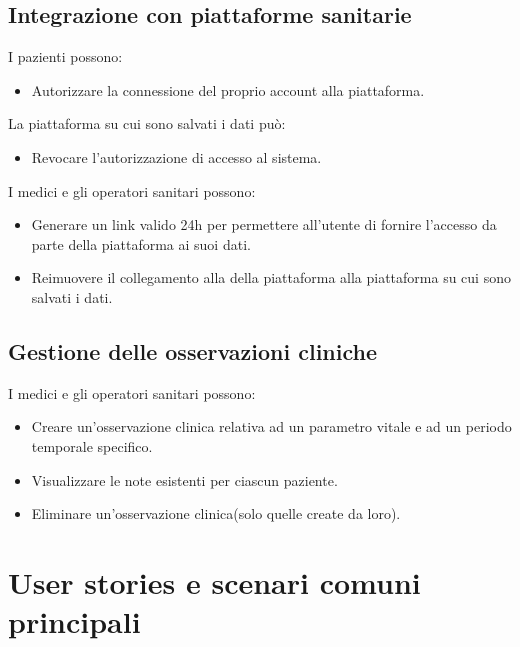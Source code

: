 \documentclass[12pt,a4paper,oneside]{report}
\begin{document}
\subsection{Integrazione con piattaforme sanitarie}
I pazienti possono:
\begin{itemize}
    \item Autorizzare la connessione del proprio account alla piattaforma.
\end{itemize}
La piattaforma su cui sono salvati i dati può:
\begin{itemize}
    \item Revocare l'autorizzazione di accesso al sistema.
\end{itemize}
I medici e gli operatori sanitari possono:
\begin{itemize}
    \item Generare un link valido 24h per permettere all'utente di fornire l'accesso da parte della piattaforma ai suoi dati.
    \item Reimuovere il collegamento alla della piattaforma alla piattaforma su cui sono salvati i dati.
\end{itemize}
\subsection{Gestione delle osservazioni cliniche}
I medici e gli operatori sanitari possono:
\begin{itemize}
    \item Creare un'osservazione clinica relativa ad un parametro vitale e ad un periodo temporale specifico.
    \item Visualizzare le note esistenti per ciascun paziente.
    \item Eliminare un'osservazione clinica(solo quelle create da loro).
\end{itemize}



\section{User stories e scenari comuni principali}
\end{document}
